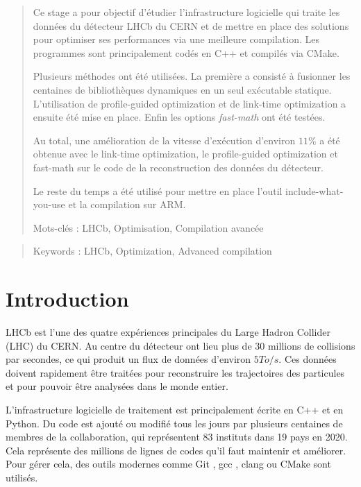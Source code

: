 \documentclass[a4paper,11pt]{report}
\begin{document}
\tableofcontents

\listoffigures


\begin{abstract}

    Ce stage a pour objectif d'étudier l'infrastructure logicielle qui traite les données du détecteur LHCb du CERN et de mettre en place des solutions pour optimiser ses performances via une meilleure compilation.
    Les programmes sont principalement codés en C++ et compilés via CMake.

    Plusieurs méthodes ont été utilisées.
    La première a consisté à fusionner les centaines de bibliothèques dynamiques en un seul exécutable statique.
    L'utilisation de profile-guided optimization et de link-time optimization a ensuite été mise en place.
    Enfin les options \emph{fast-math} ont été testées.

    Au total, une amélioration de la vitesse d'exécution d'environ $11\%$ a été obtenue avec le link-time optimization, le profile-guided optimization et fast-math sur le code de la reconstruction des données du détecteur.

    Le reste du temps a été utilisé pour mettre en place l'outil include-what-you-use et la compilation sur ARM.
    \vfill

    Mots-clés : LHCb, Optimisation, Compilation avancée

\end{abstract}

\begin{otherlanguage}{english}
    \begin{abstract}

        \vfill

        Keywords : LHCb, Optimization, Advanced compilation
    \end{abstract}
\end{otherlanguage}


\chapter*{Introduction}
LHCb est l'une des quatre expériences principales du Large Hadron Collider (LHC) du CERN.
Au centre du détecteur ont lieu plus de 30 millions de collisions par secondes, ce qui produit un flux de données d'environ $5 To/s$.
Ces données doivent rapidement être traitées pour reconstruire les trajectoires des particules et pour pouvoir être analysées dans le monde entier.

L'infrastructure logicielle de traitement est principalement écrite en C++ et en Python.
Du code est ajouté ou modifié tous les jours par plusieurs centaines de membres de la collaboration, qui représentent 83 instituts dans 19 pays en 2020.
Cela représente des millions de lignes de codes qu'il faut maintenir et améliorer.
Pour gérer cela, des outils modernes comme Git \cite{git}, gcc \cite{gcc}, clang \cite{clang} ou CMake \cite{cmake} sont utilisés.
\end{document}
